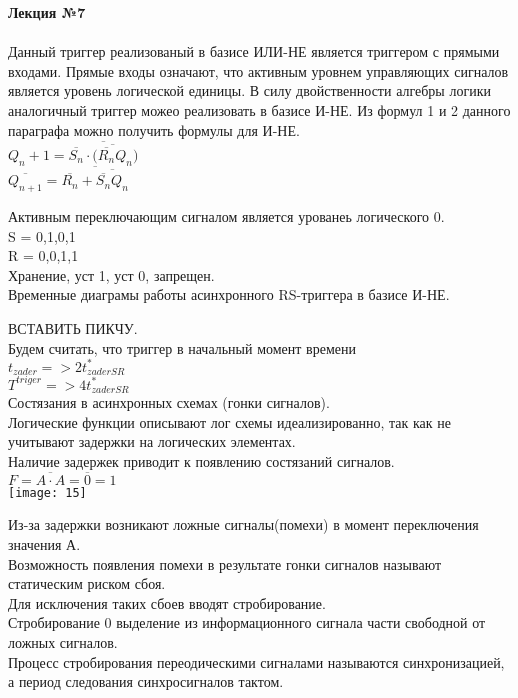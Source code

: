 

\LARGE{ \textbf {Лекция №7}}\\
\Large{ \textbf {}}\\
Данный триггер реализованый в базисе ИЛИ-НЕ является триггером с прямыми входами.
Прямые входы означают, что активным уровнем управляющих сигналов является уровень логической единицы.
В силу двойственности алгебры логики аналогичный триггер можео реализовать в базисе И-НЕ.
Из формул 1 и 2 данного параграфа можно получить формулы для И-НЕ.\\
$Q_n+1 =\overline{ \overline{S_n} \cdot \overline{( \overline{R_n} Q_n })}$\\
$\overline{Q_{n+1} }= \overline{  \overline{R_n} + \overline{ \overline{S_n} Q_n }}$

Активным переключающим сигналом является урованеь логического 0.\\
S = 0,1,0,1\\
R = 0,0,1,1\\
Хранение, уст 1, уст 0, запрещен.\\


Временные диаграмы работы асинхронного RS-триггера в базисе И-НЕ.

ВСТАВИТЬ ПИКЧУ.\\

Будем считать, что триггер в начальный момент времени\\
$t_{zader} => 2t^*_{zaderSR}$\\
$T^{triger} => 4 t^*_{zaderSR}$ \\

Состязания в асинхронных схемах (гонки сигналов).\\

Логические функции описывают лог схемы идеализированно, так как не учитывают задержки на логических элементах.\\
Наличие задержек приводит к появлению состязаний сигналов.\\

$F = \overline{A \cdot A} = \overline{0} = 1 $\\
\texttt{[image: 15]}

Из-за задержки возникают ложные сигналы(помехи) в момент переключения значения А.\\
Возможность появления помехи в результате гонки сигналов называют статическим риском сбоя.\\
Для исключения таких сбоев вводят стробирование.\\
Стробирование 0 выделение из информационного сигнала части свободной от ложных сигналов.\\
Процесс стробирования переодическими сигналами называются синхронизацией, а период следования синхросигналов тактом. \\

